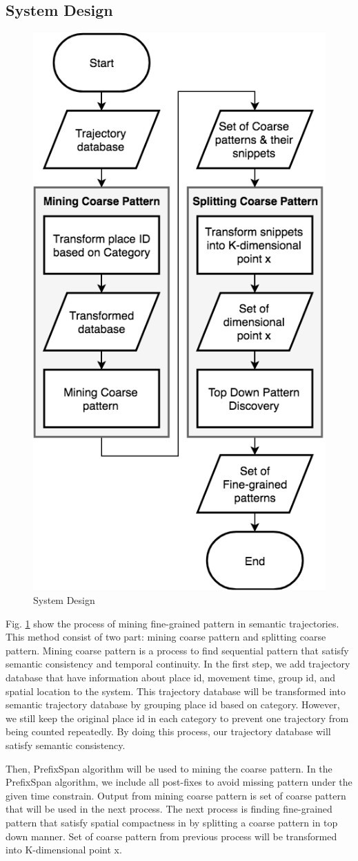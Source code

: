 \documentclass[conference]{IEEEtran}
\begin{document}
\subsection{System Design}
\begin{figure}[!ht]
\centering
\includegraphics[width=0.55\linewidth]{splitter}
\caption{System Design}
\label{fig:systemdesign}
\end{figure}
Fig. \ref{fig:systemdesign} show the process of mining fine-grained pattern in semantic trajectories. This method consist of two part: mining coarse pattern and splitting coarse pattern. Mining coarse pattern is a process to find sequential pattern that satisfy semantic consistency and temporal continuity. In the first step, we add trajectory database that have information about place id, movement time, group id, and spatial location to the system. This trajectory database will be transformed into semantic trajectory database by grouping place id based on category. However, we still keep the original place id in each category to prevent one trajectory from being counted repeatedly. By doing this process, our trajectory database will satisfy semantic consistency.
\par
Then, PrefixSpan algorithm will be used to mining the coarse pattern. In the PrefixSpan algorithm, we include all post-fixes to avoid missing pattern under the given time constrain. Output from mining coarse pattern is set of coarse pattern that will be used in the next process. The next process is finding fine-grained pattern that satisfy spatial compactness in by splitting a coarse pattern in top down manner. Set of coarse pattern from previous process will be transformed into K-dimensional point x.
\end{document}
